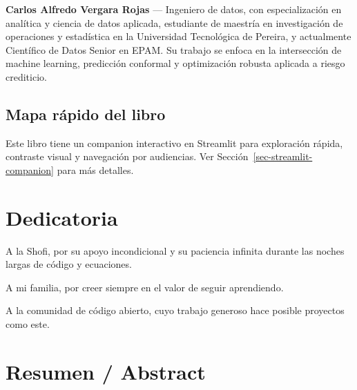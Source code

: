 \documentclass[
  spanish,
  11pt,
  letterpaper,
]{scrbook}
\theoremstyle{plain}
\theoremstyle{remark}
\begin{document}
\textbf{Carlos Alfredo Vergara Rojas} --- Ingeniero de datos, con
especialización en analítica y ciencia de datos aplicada, estudiante de
maestría en investigación de operaciones y estadística en la Universidad
Tecnológica de Pereira, y actualmente Científico de Datos Senior en
EPAM. Su trabajo se enfoca en la intersección de machine learning,
predicción conformal y optimización robusta aplicada a riesgo
crediticio.

\section{Mapa rápido del libro}\label{mapa-ruxe1pido-del-libro}

\begin{tcolorbox}[enhanced jigsaw, arc=.35mm, bottomrule=.15mm, bottomtitle=1mm, breakable, colback=white, colbacktitle=quarto-callout-note-color!10!white, colframe=quarto-callout-note-color-frame, coltitle=black, left=2mm, leftrule=.75mm, opacityback=0, opacitybacktitle=0.6, rightrule=.15mm, title=\textcolor{quarto-callout-note-color}{\faInfo}\hspace{0.5em}{Companion interactivo}, titlerule=0mm, toprule=.15mm, toptitle=1mm]

Este libro tiene un companion interactivo en Streamlit para exploración
rápida, contraste visual y navegación por audiencias. Ver
Sección~\ref{sec-streamlit-companion} para más detalles.

\end{tcolorbox}


\chapter{Dedicatoria}\label{dedicatoria}

A la Shofi, por su apoyo incondicional y su paciencia infinita durante
las noches largas de código y ecuaciones.

A mi familia, por creer siempre en el valor de seguir aprendiendo.

A la comunidad de código abierto, cuyo trabajo generoso hace posible
proyectos como este.


\chapter{Resumen / Abstract}\label{resumen-abstract}
\end{document}
